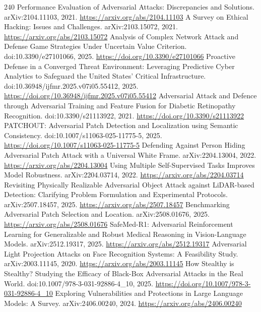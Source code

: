 \documentclass[11pt]{article}
\begin{document}
\begin{thebibliography}{240}
 Performance Evaluation of Adversarial Attacks: Discrepancies and Solutions. arXiv:2104.11103, 2021. \url{https://arxiv.org/abs/2104.11103}
 A Survey on Ethical Hacking: Issues and Challenges. arXiv:2103.15072, 2021. \url{https://arxiv.org/abs/2103.15072}
 Analysis of Complex Network Attack and Defense Game Strategies Under Uncertain Value Criterion. doi:10.3390/e27101066, 2025. \url{https://doi.org/10.3390/e27101066}
 Proactive Defense in a Converged Threat Environment: Leveraging Predictive Cyber Analytics to Safeguard the United States' Critical Infrastructure. doi:10.36948/ijfmr.2025.v07i05.55412, 2025. \url{https://doi.org/10.36948/ijfmr.2025.v07i05.55412}
 Adversarial Attack and Defence through Adversarial Training and Feature Fusion for Diabetic Retinopathy Recognition. doi:10.3390/s21113922, 2021. \url{https://doi.org/10.3390/s21113922}
 PATCHOUT: Adversarial Patch Detection and Localization using Semantic Consistency. doi:10.1007/s11063-025-11775-5, 2025. \url{https://doi.org/10.1007/s11063-025-11775-5}
 Defending Against Person Hiding Adversarial Patch Attack with a Universal White Frame. arXiv:2204.13004, 2022. \url{https://arxiv.org/abs/2204.13004}
 Using Multiple Self-Supervised Tasks Improves Model Robustness. arXiv:2204.03714, 2022. \url{https://arxiv.org/abs/2204.03714}
 Revisiting Physically Realizable Adversarial Object Attack against LiDAR-based Detection: Clarifying Problem Formulation and Experimental Protocols. arXiv:2507.18457, 2025. \url{https://arxiv.org/abs/2507.18457}
 Benchmarking Adversarial Patch Selection and Location. arXiv:2508.01676, 2025. \url{https://arxiv.org/abs/2508.01676}
 SafeMed-R1: Adversarial Reinforcement Learning for Generalizable and Robust Medical Reasoning in Vision-Language Models. arXiv:2512.19317, 2025. \url{https://arxiv.org/abs/2512.19317}
 Adversarial Light Projection Attacks on Face Recognition Systems: A Feasibility Study. arXiv:2003.11145, 2020. \url{https://arxiv.org/abs/2003.11145}
 How Stealthy is Stealthy? Studying the Efficacy of Black-Box Adversarial Attacks in the Real World. doi:10.1007/978-3-031-92886-4\_10, 2025. \url{https://doi.org/10.1007/978-3-031-92886-4_10}
 Exploring Vulnerabilities and Protections in Large Language Models: A Survey. arXiv:2406.00240, 2024. \url{https://arxiv.org/abs/2406.00240}
\end{thebibliography}
\end{document}
